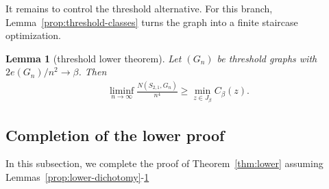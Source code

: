 \documentclass[10pt,a4paper]{article}
\newtheorem{lemma}[definition]{Lemma}
\begin{document}
It remains to control the threshold alternative. For this branch, 
Lemma~\ref{prop:threshold-classes} turns the graph into a finite staircase optimization.


\begin{lemma}[threshold lower theorem]\label{prop:threshold-lower}
Let $(G_n)$ be threshold graphs with $2e(G_n)/n^2\to\beta$.  Then
\begin{align*}
  \liminf_{n\to\infty}\frac{N(S_{2,1},G_n)}{n^4}
  \ge
  \min_{z\in J_\beta} C_\beta(z).
\end{align*}
\end{lemma}





\subsection{Completion of the lower proof}\label{subsec:lower-completion}
In this subsection, we complete the proof 
of Theorem~\ref{thm:lower} assuming Lemmas~\ref{prop:lower-dichotomy}-\ref{prop:threshold-lower}
\end{document}
